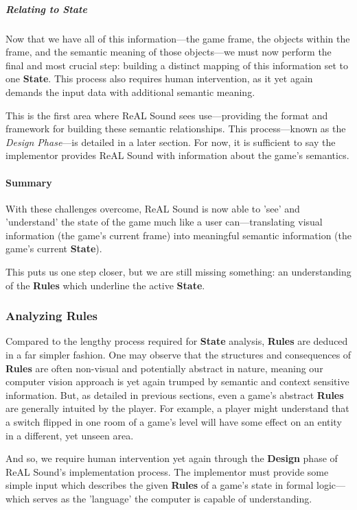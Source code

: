 \documentclass{report}
\newcommand{\rs}{ReAL Sound\xspace}
\newcommand{\state}[1]{\textbf{#1}}
\newcommand{\rules}{\textbf{Rules}\xspace}
\begin{document}
\subparagraph{Relating to State}
Now that we have all of this information---the game frame, the objects within the frame, and the semantic meaning of those objects---we must now perform the final and most crucial step: building a distinct mapping of this information set to one \state{State}. This process also requires human intervention, as it yet again demands the input data with additional semantic meaning. 

This is the first area where \rs sees use---providing the format and framework for building these semantic relationships. This process---known as the \emph{Design Phase}---is detailed in a later section. For now, it is sufficient to say the implementor provides \rs with information about the game's semantics.

\paragraph{Summary}

With these challenges overcome, \rs is now able to 'see' and 'understand' the state of the game much like a user can---translating visual information (the game's current frame) into meaningful semantic information (the game's current \state{State}). 

This puts us one step closer, but we are still missing something: an understanding of the \state{Rules} which underline the active \state{State}.

\subsubsection{Analyzing \state{Rules}}
Compared to the lengthy process required for \state{State} analysis, \rules are deduced in a far simpler fashion. One may observe that the structures and consequences of \rules are often non-visual and potentially abstract in nature, meaning our computer vision approach is yet again trumped by semantic and context sensitive information. But, as detailed in previous sections, even a game's abstract \rules are generally intuited by the player. For example, a player might understand that a switch flipped in one room of a game's level will have some effect on an entity in a different, yet unseen area. 

And so, we require human intervention yet again through the \state{Design} phase of \rs's implementation process. The implementor must provide some simple input which describes the given \rules of a game's state in formal logic---which serves as the 'language' the computer is capable of understanding.
\end{document}
